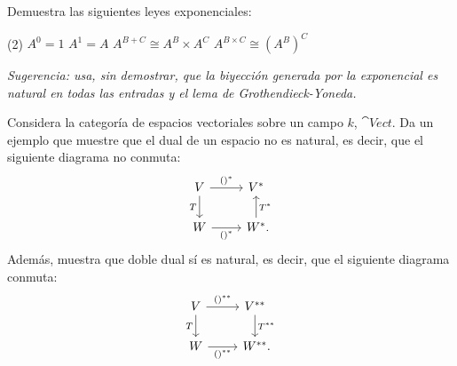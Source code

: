 \begin{exercise}[par=2]
  Demuestra las siguientes leyes exponenciales:
  \begin{tasks}(2)
    \task \(A^0=1\)
    \task \(A^1=A\)
    \task \(A^{B+C}\cong A^B\times A^C\)
    \task \(A^{B\times C}\cong (A^B)^C\)
  \end{tasks}
  \textit{Sugerencia: usa, sin demostrar, que la biyección generada por la exponencial es natural en todas las entradas y el lema de Grothendieck-Yoneda.}
\end{exercise}

\begin{exercise}[par=2]
  Considera la categoría de espacios vectoriales sobre un campo \(k\),
  \(\cat{Vect}\). Da un ejemplo que muestre que el dual de un espacio no es
  natural, es decir, que el siguiente diagrama no conmuta:
  \begin{equation*}
    \begin{tikzcd}[ampersand replacement=\&]
      V\ar{r}{()^*}\ar{d}[swap]{T} \& V^*\\
      W\ar{r}[swap]{()^*} \& W^*\mathrlap{.}\ar{u}[swap]{T^*}     
    \end{tikzcd}
  \end{equation*}
  Además, muestra que doble dual sí es natural, es decir, que el
  siguiente diagrama conmuta:
  \begin{equation*}
    \begin{tikzcd}[ampersand replacement=\&]
      V\ar{r}{()^{**}}\ar{d}[swap]{T} \& V^{**}\ar{d}{T^{**}}\\
      W\ar{r}[swap]{()^{**}} \& W^{**}\mathrlap{.}
    \end{tikzcd}
  \end{equation*}
\end{exercise}
